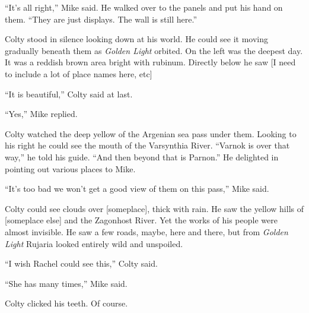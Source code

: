 ``It's all right,'' Mike said. He walked over to the panels and put his hand on them. ``They are
just displays. The wall is still here.''



Colty stood in silence looking down at his world. He could see it moving gradually beneath them
as \textit{Golden Light} orbited. On the left was the deepest day. It was a reddish brown area
bright with rubinum. Directly below he saw [I need to include a lot of place names here, etc]

``It is beautiful,'' Colty said at last.

``Yes,'' Mike replied.

Colty watched the deep yellow of the Argenian sea pass under them. Looking to his right he could
see the mouth of the Varsynthia River. ``Varnok is over that way,'' he told his guide. ``And
then beyond that is Parnon.'' He delighted in pointing out various places to Mike.

``It's too bad we won't get a good view of them on this pass,'' Mike said.

Colty could see clouds over [someplace], thick with rain. He saw the yellow hills of [someplace
else] and the Zagonhost River. Yet the works of his people were almost invisible. He saw a few
roads, maybe, here and there, but from \textit{Golden Light} Rujaria looked entirely wild and
unspoiled.

``I wish Rachel could see this,'' Colty said.

``She has many times,'' Mike said.

Colty clicked his teeth. Of course.

